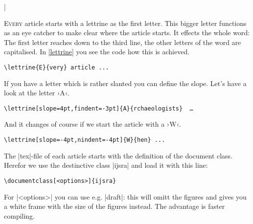\documentclass[
	]{ijsra}
\begin{document}
\lstMakeShortInline[style=code]|
\IJSRAopening



\lettrine{E}{very}  article starts with a lettrine as the first letter.
This bigger letter functions as an eye catcher to make clear where the article starts.
It effects the whole word: The first letter reaches down to the third line, the other letters of the word are capitalised. 
In \cref{lettrine} you see the code how this is achieved.

 \begin{lstlisting}[label=lettrine,caption={Starting letter}]
\lettrine{E}{very} article ... 
\end{lstlisting}
If you have a letter which is rather slanted you can define the slope. 
Let’s have a look at the letter ›A‹.
 \begin{lstlisting}[label=lettrine,caption={Starting letter ›A‹}]
\lettrine[slope=4pt,findent=-3pt]{A}{rchaeologists}  …
\end{lstlisting}
And it changes of course if we start the article with a ›W‹. 
 \begin{lstlisting}[label=lettrine,caption={Starting letter ›W‹}]
\lettrine[slope=-4pt,nindent=-4pt]{W}{hen} ...
\end{lstlisting}

\IJSRAseparator
The |tex|-file of each article starts with the definition of the  document class.
Herefor we use the destinctive class |ijsra| and load it with this line:
\begin{lstlisting}[label=documentclass,caption={First line of tex-file.}]
\documentclass[<options>]{ijsra}
\end{lstlisting}
For  |<options>| you can use e.g. |draft|: this will omitt the figures and gives you a white frame with the size of the figures instead. 
The advantage is faster compiling.
\end{document}
